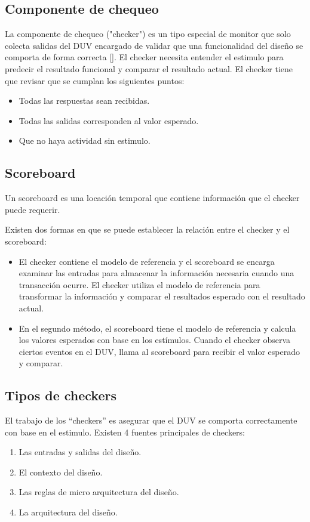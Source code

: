 \subsection{Componente de chequeo}

La componente  de chequeo ("checker") es un tipo especial de monitor que solo colecta salidas del DUV encargado de validar que una funcionalidad del diseño se comporta de forma correcta [\cite{Wile}].
El checker necesita entender el estimulo para predecir el resultado funcional y comparar el resultado actual.
El checker tiene que revisar que se cumplan los siguientes puntos:
\begin{itemize}
\item Todas las respuestas sean recibidas.
\item Todas las salidas corresponden al valor esperado.
\item Que no haya actividad sin estimulo.
\end{itemize}

\subsection{Scoreboard}

Un scoreboard es una locación temporal que contiene información que el checker puede requerir.

Existen dos formas en que se puede establecer la relación entre el checker y el scoreboard:
\begin{itemize}
\item El checker contiene el modelo de referencia y el scoreboard se encarga examinar las entradas para
almacenar la información necesaria cuando una transacción ocurre. El checker utiliza el modelo de referencia para transformar la información y comparar el resultados esperado con el resultado actual.
\item En el segundo método, el scoreboard tiene el modelo de referencia y calcula los valores esperados con base en los estímulos. Cuando el checker observa ciertos eventos en el DUV, llama al scoreboard para recibir el valor esperado y comparar.
\end{itemize}

\subsection{Tipos de checkers}

El trabajo de los “checkers” es asegurar que el DUV se comporta correctamente con base en el estimulo. Existen 4 fuentes principales de checkers:
\begin{enumerate}
\item Las entradas y salidas del diseño.
\item El contexto del diseño.
\item Las reglas de micro arquitectura del diseño.
\item La arquitectura del diseño.
\end{enumerate}


